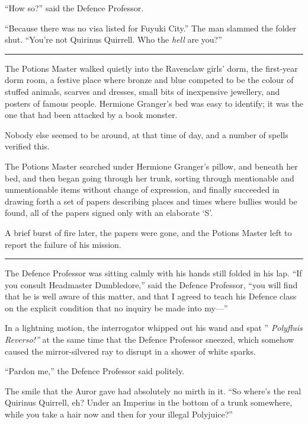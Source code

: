 ``How so?'' said the Defence Professor.

``Because there was no visa listed for Fuyuki City.'' The man slammed
the folder shut. ``You're not Quirinus Quirrell. Who the \emph{hell} are
you?''

\begin{center}\rule{3in}{0.4pt}\end{center}

The Potions Master walked quietly into the Ravenclaw girls' dorm, the
first-year dorm room, a festive place where bronze and blue competed to
be the colour of stuffed animals, scarves and dresses, small bits of
inexpensive jewellery, and posters of famous people. Hermione Granger's
bed was easy to identify; it was the one that had been attacked by a
book monster.

Nobody else seemed to be around, at that time of day, and a number of
spells verified this.

The Potions Master searched under Hermione Granger's pillow, and beneath
her bed, and then began going through her trunk, sorting through
mentionable and unmentionable items without change of expression, and
finally succeeded in drawing forth a set of papers describing places and
times where bullies would be found, all of the papers signed only with
an elaborate `S'.

A brief burst of fire later, the papers were gone, and the Potions
Master left to report the failure of his mission.

\begin{center}\rule{3in}{0.4pt}\end{center}

The Defence Professor was sitting calmly with his hands still folded in
his lap. ``If you consult Headmaster Dumbledore,'' said the Defence
Professor, ``you will find that he is well aware of this matter, and
that I agreed to teach his Defence class on the explicit condition that
no inquiry be made into my---''

In a lightning motion, the interrogator whipped out his wand and spat ''
\emph{Polyfluis Reverso!''} at the same time that the Defence Professor
sneezed, which somehow caused the mirror-silvered ray to disrupt in a
shower of white sparks.

``Pardon me,'' the Defence Professor said politely.

The smile that the Auror gave had absolutely no mirth in it. ``So
where's the real Quirinus Quirrell, eh? Under an Imperius in the bottom
of a trunk somewhere, while you take a hair now and then for your
illegal Polyjuice?''

